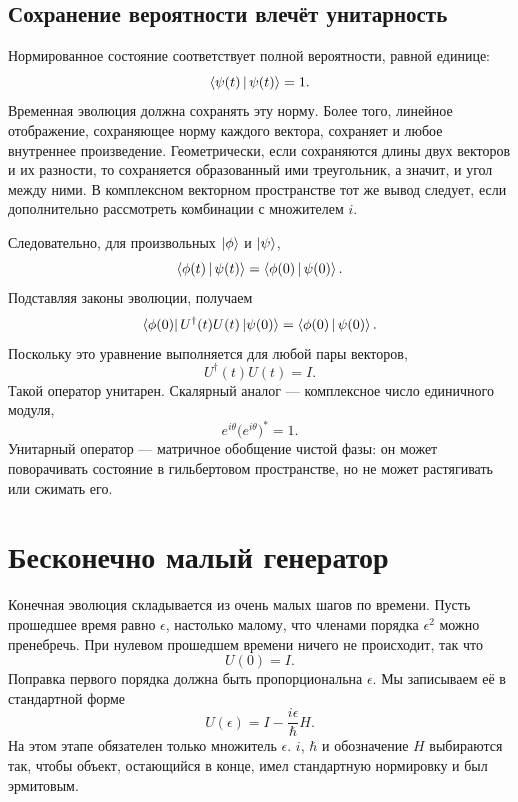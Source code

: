 \subsection{Сохранение вероятности влечёт унитарность}

Нормированное состояние соответствует полной вероятности, равной единице:
\begin{equation}
\left\langle\psi(t)\,\middle|\,\psi(t)\right\rangle=1.
\end{equation}
Временная эволюция должна сохранять эту норму. Более того, линейное отображение, сохраняющее норму каждого вектора, сохраняет и любое внутреннее произведение. Геометрически, если сохраняются длины двух векторов и их разности, то сохраняется образованный ими треугольник, а значит, и угол между ними. В комплексном векторном пространстве тот же вывод следует, если дополнительно рассмотреть комбинации с множителем \(i\).

Следовательно, для произвольных \(\left\lvert\phi\right\rangle\) и \(\left\lvert\psi\right\rangle\),
\begin{equation}
\left\langle\phi(t)\,\middle|\,\psi(t)\right\rangle
=
\left\langle\phi(0)\,\middle|\,\psi(0)\right\rangle.
\end{equation}
Подставляя законы эволюции, получаем
\begin{equation}
\left\langle\phi(0)\right\rvert U^\dagger(t)U(t)\left\lvert\psi(0)\right\rangle
=
\left\langle\phi(0)\,\middle|\,\psi(0)\right\rangle.
\end{equation}
Поскольку это уравнение выполняется для любой пары векторов,
\begin{equation}
\boxed{U^\dagger(t)U(t)=I}.
\end{equation}
Такой оператор унитарен. Скалярный аналог — комплексное число единичного модуля,
\begin{equation}
e^{i\theta}\bigl(e^{i\theta}\bigr)^*=1.
\end{equation}
Унитарный оператор — матричное обобщение чистой фазы: он может поворачивать состояние в гильбертовом пространстве, но не может растягивать или сжимать его.

\section{Бесконечно малый генератор}

Конечная эволюция складывается из очень малых шагов по времени. Пусть прошедшее время равно \(\epsilon\), настолько малому, что членами порядка \(\epsilon^2\) можно пренебречь. При нулевом прошедшем времени ничего не происходит, так что
\begin{equation}
U(0)=I.
\end{equation}
Поправка первого порядка должна быть пропорциональна \(\epsilon\). Мы записываем её в стандартной форме
\begin{equation}
\boxed{U(\epsilon)=I-\frac{i\epsilon}{\hbar}H}.
\end{equation}
На этом этапе обязателен только множитель \(\epsilon\). \(i\), \(\hbar\) и обозначение \(H\) выбираются так, чтобы объект, остающийся в конце, имел стандартную нормировку и был эрмитовым.

